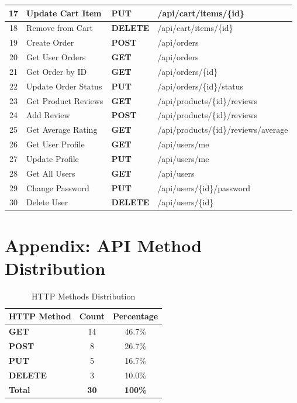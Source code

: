 \documentclass[12pt, a4paper]{article}
\begin{document}
\begin{longtable}{|c|l|l|p{5cm}|}
\hline
17 & Update Cart Item & \textcolor{putcolor}{\textbf{PUT}} & /api/cart/items/\{id\} \\
\hline
18 & Remove from Cart & \textcolor{deletecolor}{\textbf{DELETE}} & /api/cart/items/\{id\} \\
\hline
19 & Create Order & \textcolor{postcolor}{\textbf{POST}} & /api/orders \\
\hline
20 & Get User Orders & \textcolor{getcolor}{\textbf{GET}} & /api/orders \\
\hline
21 & Get Order by ID & \textcolor{getcolor}{\textbf{GET}} & /api/orders/\{id\} \\
\hline
22 & Update Order Status & \textcolor{putcolor}{\textbf{PUT}} & /api/orders/\{id\}/status \\
\hline
23 & Get Product Reviews & \textcolor{getcolor}{\textbf{GET}} & /api/products/\{id\}/reviews \\
\hline
24 & Add Review & \textcolor{postcolor}{\textbf{POST}} & /api/products/\{id\}/reviews \\
\hline
25 & Get Average Rating & \textcolor{getcolor}{\textbf{GET}} & /api/products/\{id\}/reviews/average \\
\hline
26 & Get User Profile & \textcolor{getcolor}{\textbf{GET}} & /api/users/me \\
\hline
27 & Update Profile & \textcolor{putcolor}{\textbf{PUT}} & /api/users/me \\
\hline
28 & Get All Users & \textcolor{getcolor}{\textbf{GET}} & /api/users \\
\hline
29 & Change Password & \textcolor{putcolor}{\textbf{PUT}} & /api/users/\{id\}/password \\
\hline
30 & Delete User & \textcolor{deletecolor}{\textbf{DELETE}} & /api/users/\{id\} \\
\hline
\end{longtable}

\section{Appendix: API Method Distribution}

\begin{table}[H]
\centering
\caption{HTTP Methods Distribution}
\begin{tabular}{|l|c|c|}
\hline
\textbf{HTTP Method} & \textbf{Count} & \textbf{Percentage} \\
\hline
\textcolor{getcolor}{\textbf{GET}} & 14 & 46.7\% \\
\hline
\textcolor{postcolor}{\textbf{POST}} & 8 & 26.7\% \\
\hline
\textcolor{putcolor}{\textbf{PUT}} & 5 & 16.7\% \\
\hline
\textcolor{deletecolor}{\textbf{DELETE}} & 3 & 10.0\% \\
\hline
\textbf{Total} & \textbf{30} & \textbf{100\%} \\
\hline
\end{tabular}
\end{table}
\end{document}
